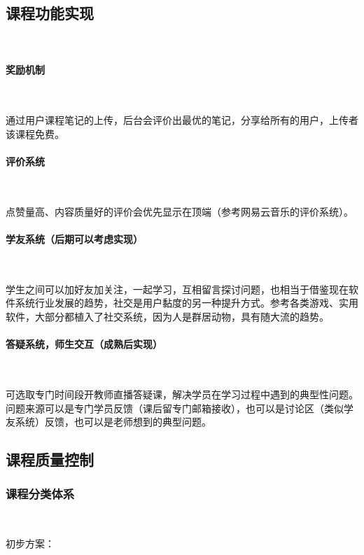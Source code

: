 \subsection{课程功能实现}\

\paragraph{奖励机制}\

通过用户课程笔记的上传，后台会评价出最优的笔记，分享给所有的用户，上传者该课程免费。

\paragraph{评价系统}\

点赞量高、内容质量好的评价会优先显示在顶端（参考网易云音乐的评价系统）。

\paragraph{学友系统（后期可以考虑实现）}\

学生之间可以加好友加关注，一起学习，互相留言探讨问题，也相当于借鉴现在软件系统行业发展的趋势，社交是用户黏度的另一种提升方式。参考各类游戏、实用软件，大部分都植入了社交系统，因为人是群居动物，具有随大流的趋势。

\paragraph{答疑系统，师生交互（成熟后实现）}\

可选取专门时间段开教师直播答疑课，解决学员在学习过程中遇到的典型性问题。问题来源可以是专门学员反馈（课后留专门邮箱接收），也可以是讨论区（类似学友系统）反馈，也可以是老师想到的典型问题。

\subsection{课程质量控制}
\subsubsection{课程分类体系}\

初步方案：

